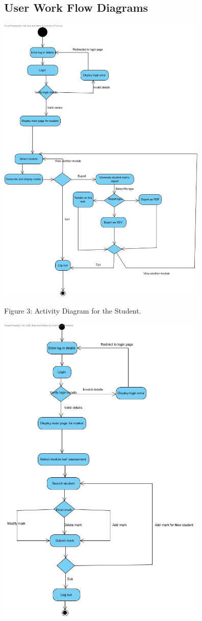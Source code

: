 \documentclass[a4paper]{article}
\begin{document}
\subsection*{User Work Flow Diagrams}
\includegraphics[width=380px]{Images/WEBUWStudentActivity.jpg}
\begin{center}
Figure 3: Activity Diagram for the Student.
\end{center}
\includegraphics[width=380px]{Images/WEBUWMarkerActivity.jpg}
\end{document}
